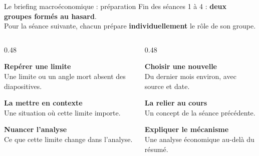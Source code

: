 \documentclass[aspectratio=169]{beamer}
\begin{document}
\begin{frame}[t]{Le briefing macroéconomique : préparation}
   \small
   Fin des séances 1 à 4 : \textbf{deux groupes formés au hasard}. \\
   \vspace{0.15cm}
   Pour la séance suivante, chacun prépare \textbf{individuellement} le rôle de son groupe.
   \vspace{-0.2cm}
   \begin{columns}[T,onlytextwidth]
      \begin{column}{0.48\textwidth}
         \begin{tcolorbox}[title={\strut Le regard critique}]
            \raggedright
            \textbf{Repérer une limite} \\
            Une limite ou un angle mort absent des diapositives.
            \par\vspace{0.1cm}
            \textbf{La mettre en contexte} \\
            Une situation où cette limite importe.
            \par\vspace{0.1cm}
            \textbf{Nuancer l'analyse} \\
            Ce que cette limite change dans l'analyse.
         \end{tcolorbox}
      \end{column}
      \begin{column}{0.48\textwidth}
         \begin{tcolorbox}[title={\strut La macro dans l'actualité}]
            \raggedright
            \textbf{Choisir une nouvelle} \\
            Du dernier mois environ, avec source et date.
            \par\vspace{0.1cm}
            \textbf{La relier au cours} \\
            Un concept de la séance précédente.
            \par\vspace{0.1cm}
            \textbf{Expliquer le mécanisme} \\
            Une analyse économique au-delà du résumé.
         \end{tcolorbox}
      \end{column}
   \end{columns}
\end{frame}
\end{document}
